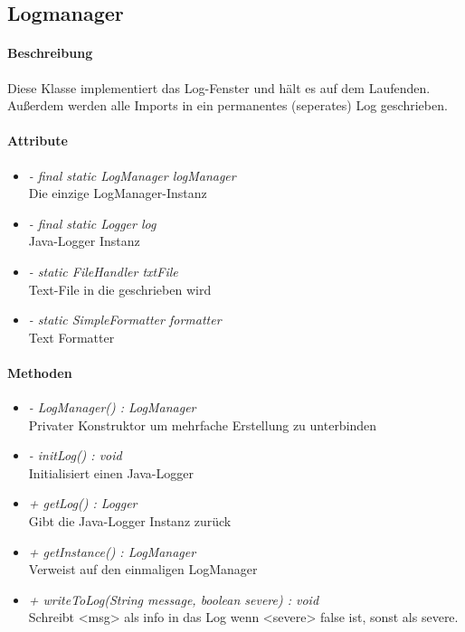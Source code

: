 \subsection{Logmanager}

\paragraph{Beschreibung}
Diese Klasse implementiert das Log-Fenster und hält es auf dem Laufenden.
Außerdem werden alle Imports in ein permanentes (seperates) Log geschrieben.


\paragraph{Attribute}

\begin{itemize}
	
\item \textit{- final static LogManager logManager}  
\\ Die einzige LogManager-Instanz 
\item \textit{- final static Logger log}
\\ Java-Logger Instanz
\item \textit{- static FileHandler txtFile}
\\ Text-File in die geschrieben wird
\item \textit{- static SimpleFormatter formatter}
\\ Text Formatter

\end{itemize}

\paragraph{Methoden}

\begin{itemize}
	
\item \textit{ - LogManager() : LogManager}  \\ Privater Konstruktor um mehrfache Erstellung zu unterbinden
\item \textit{ - initLog() : void} \\ Initialisiert einen Java-Logger
\item \textit{ + getLog() : Logger} \\ Gibt die Java-Logger Instanz zurück
\item \textit{ + getInstance() : LogManager}  \\ Verweist auf den einmaligen LogManager
\item \textit{ + writeToLog(String message, boolean severe) : void} \\ Schreibt <msg> als info in das Log wenn <severe> false ist,
sonst als severe.
	
\end{itemize}